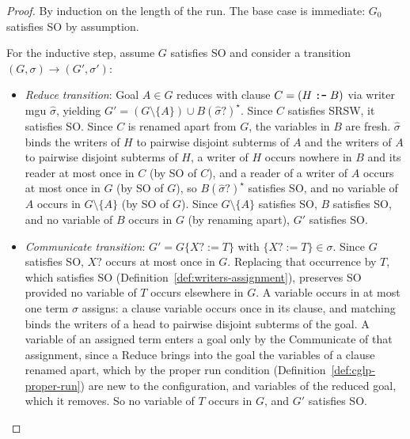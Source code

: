 \propSOPreservation*

\begin{proof}
By induction on the length of the run. The base case is immediate: $G_0$ satisfies SO by assumption.

For the inductive step, assume $G$ satisfies SO and consider a transition $(G, \sigma) \rightarrow (G', \sigma')$:
\begin{itemize}
    \item \emph{Reduce transition}: Goal $A \in G$ reduces with clause $C = (H \mathrel{\mbox{\texttt{:-}}} B)$ via writer mgu $\hat\sigma$, yielding $G' = (G \setminus \{A\}) \cup B(\hat\sigma?)^\star$. Since $C$ satisfies SRSW, it satisfies SO. Since $C$ is renamed apart from $G$, the variables in $B$ are fresh. $\hat\sigma$ binds the writers of $H$ to pairwise disjoint subterms of $A$ and the writers of $A$ to pairwise disjoint subterms of $H$, a writer of $H$ occurs nowhere in $B$ and its reader at most once in $C$ (by SO of $C$), and a reader of a writer of $A$ occurs at most once in $G$ (by SO of $G$), so $B(\hat\sigma?)^\star$ satisfies SO, and no variable of $A$ occurs in $G \setminus \{A\}$ (by SO of $G$). Since $G \setminus \{A\}$ satisfies SO, $B$ satisfies SO, and no variable of $B$ occurs in $G$ (by renaming apart), $G'$ satisfies SO.

    \item \emph{Communicate transition}: $G' = G\{X? := T\}$ with $\{X? := T\} \in \sigma$. Since $G$ satisfies SO, $X?$ occurs at most once in $G$. Replacing that occurrence by $T$, which satisfies SO (Definition~\ref{def:writers-assignment}), preserves SO provided no variable of $T$ occurs elsewhere in $G$. A variable occurs in at most one term $\sigma$ assigns: a clause variable occurs once in its clause, and matching binds the writers of a head to pairwise disjoint subterms of the goal. A variable of an assigned term enters a goal only by the Communicate of that assignment, since a Reduce brings into the goal the variables of a clause renamed apart, which by the proper run condition (Definition~\ref{def:cglp-proper-run}) are new to the configuration, and variables of the reduced goal, which it removes. So no variable of $T$ occurs in $G$, and $G'$ satisfies SO.
\end{itemize}
\end{proof}

\propMonotonicity*


